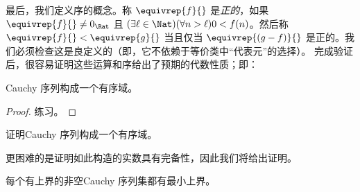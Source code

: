 \documentclass[../../../include/open-logic-section]{subfiles}
\begin{document}
最后，我们定义序的概念。称 $\equivrep{f}{}$ 是\emph{正的}，如果 $\equivrep{f}{}\neq 0_{\Rat}$ 且 $(\exists
\ell \in \Nat)(\forall n > \ell)0 < f(n)$。然后称 $\equivrep{f}{} <
\equivrep{g}{}$ 当且仅当 $\equivrep{(g - f)}{}$ 是正的。我们必须检查这是良定义的（即，它不依赖于等价类中“代表元”的选择）。
完成验证后，很容易证明这些运算和序给出了预期的代数性质；即：
\begin{thm}
Cauchy 序列构成一个有序域。
\end{thm}

\begin{proof}
练习。
\end{proof}

\begin{prob}
证明Cauchy 序列构成一个有序域。
\end{prob}

更困难的是证明如此构造的实数具有完备性，因此我们将给出证明。

\begin{thm}
每个有上界的非空Cauchy 序列集都有最小上界。
\end{thm}
\end{document}
